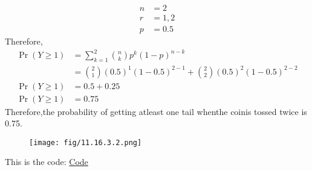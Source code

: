 \documentclass[12pt,twocolumn]{article}
\begin{document}
\begin{align}
	n &= 2\\
	r &= 1,2\\
	p &= 0.5
\end{align}
Therefore,
\begin{align}
	\Pr(Y\geq 1)&=\sum_{k=1}^2 \binom nk p^k(1-p)^{n-k}\\
	&=\binom 21(0.5)^1(1-0.5)^{2-1}+\binom 22 (0.5)^2(1-0.5)^{2-2}\\
	\Pr(Y\geq 1)&=0.5+0.25\\
	\Pr(Y\geq 1)&= 0.75
\end{align}
Therefore,the probability of getting atleast one tail whenthe coinis tossed twice is 0.75.\\
\begin{table}[h]
	
\end{table}

\begin{figure}[h]
    \centering
\texttt{[image: fig/11.16.3.2.png]}
\end{figure}
This is the code: \href{https://github.com/ShreyaniReddy/IITH-FWC/blob/main/probability/11.16.3.2/codes/11.16.3.2.py}{Code}
\end{document}
